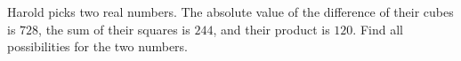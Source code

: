 Harold picks two real numbers. The absolute value of the difference of their cubes is $728$, the sum of their squares is $244$, and their product is $120$. Find all possibilities for the two numbers.
